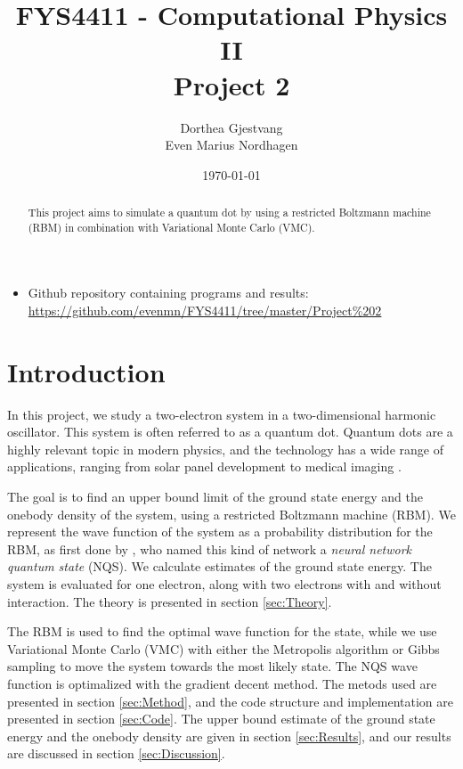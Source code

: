 \documentclass[norsk,a4paper,12pt]{article}
\title{FYS4411 - Computational Physics II\\\vspace{2mm} \Large{Project 2}}
\author{\large Dorthea Gjestvang\\ Even Marius Nordhagen}
\date\today
\begin{document}
\maketitle

\begin{itemize}
\item Github repository containing programs and results: \\\url{https://github.com/evenmn/FYS4411/tree/master/Project%202}
\end{itemize}

\begin{abstract}
This project aims to simulate a quantum dot by using a restricted Boltzmann machine (RBM) in combination with Variational Monte Carlo (VMC). 
\par 

\end{abstract}

\newpage

\tableofcontents

\newpage

\section{Introduction} \label{sec:Introduction}
In this project, we study a two-electron system in a two-dimensional harmonic oscillator. This system is often referred to as a quantum dot. Quantum dots are a highly relevant topic in modern physics, and the technology has a wide range of applications, ranging from solar panel development to medical imaging \cite{Chilton}.
\par 
\vspace{3mm}

The goal is to find an upper bound limit of the ground state energy and the onebody density of the system, using a restricted Boltzmann machine (RBM). We represent the wave function of the system as a probability distribution for the RBM, as first done by \cite{Carleo}, who named this kind of network a \emph{neural network quantum state} (NQS). We calculate estimates of the ground state energy. The system is evaluated for one electron, along with two electrons with and without interaction. The theory is presented in section \ref{sec:Theory}.
\par 
\vspace{3mm}

The RBM is used to find the optimal wave function for the state, while we use Variational Monte Carlo (VMC) with either the Metropolis algorithm or Gibbs sampling to move the system towards the most likely state. The NQS wave function is optimalized with the gradient decent method.  The metods used are presented in section \ref{sec:Method}, and the code structure and implementation are presented in section \ref{sec:Code}. The upper bound estimate of the ground state energy and the onebody density are given in section \ref{sec:Results}, and our results are discussed in section \ref{sec:Discussion}.
\end{document}
